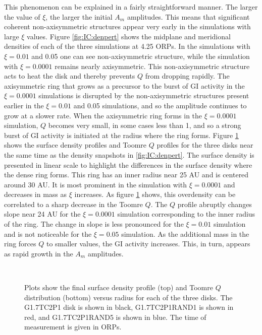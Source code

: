 This phenomenon can be explained in a fairly straightforward manner. The larger the value of $\xi$, the larger the initial $A_m$ amplitudes. This means that significant coherent non-axisymmetric structures appear very early in the simulations with large $\xi$ values. Figure \ref{fig:IC:denpert} shows the midplane and meridional densities of each of the three simulations at 4.25 ORPs. In the simulations with $\xi = 0.01$ and 0.05 one can see non-axisymmetric structure, while the simulation with $\xi = 0.0001$ remains nearly axisymmetric. This non-axisymmetric structure acts to heat the disk and thereby prevents $Q$ from dropping rapidly. The axisymmetric ring that grows as a precursor to the burst of GI activity in the $\xi = 0.0001$ simulations is disrupted by the non-axisymmetric structures present earlier in the $\xi = 0.01$ and 0.05 simulations, and so the amplitude continues to grow at a slower rate. When the axisymmetric ring forms in the $\xi = 0.0001$ simulation, $Q$ becomes very small, in some cases less than 1, and so a strong burst of GI activity is initiated at the radius where the ring forms. Figure \ref{fig:IC:pertq} shows the surface density profiles and Toomre $Q$ profiles for the three disks near the same time as the density snapshots in \ref{fig:IC:denpert}. The surface density is presented in linear scale to highlight the differences in the surface density where the dense ring forms. This ring has an inner radius near 25 AU and is centered around 30 AU. It is most prominent in the simulation with $\xi = 0.0001$ and decreases in mass as $\xi$ increases. As figure \ref{fig:IC:pertq} shows, this overdensity can be correlated to a sharp decrease in the Toomre $Q$. The $Q$ profile abruptly changes slope near 24 AU for the $\xi = 0.0001$ simulation corresponding to the inner radius of the ring. The change in slope is less pronounced for the $\xi = 0.01$ simulation and is not noticeable for the $\xi = 0.05$ simulation. As the additional mass in the ring forces $Q$ to smaller values, the GI activity increases. This, in turn, appears as rapid growth in the $A_m$ amplitudes.

\begin{figure}[p]
\centering
{}\\
\caption[Surface density and Toomre $Q$ for the simulations with varying initial random perturbations at 4 ORPs]{Plots show the final surface density profile (top) and Toomre $Q$ distribution (bottom) versus radius for each of the three disks. The G1.7TC2P1 disk is shown in black, G1.7TC2P1RAND1 is shown in red, and G1.7TC2P1RAND5 is shown in blue. The time of measurement is given in ORPs.}
\label{fig:IC:pertq}
\end{figure}

